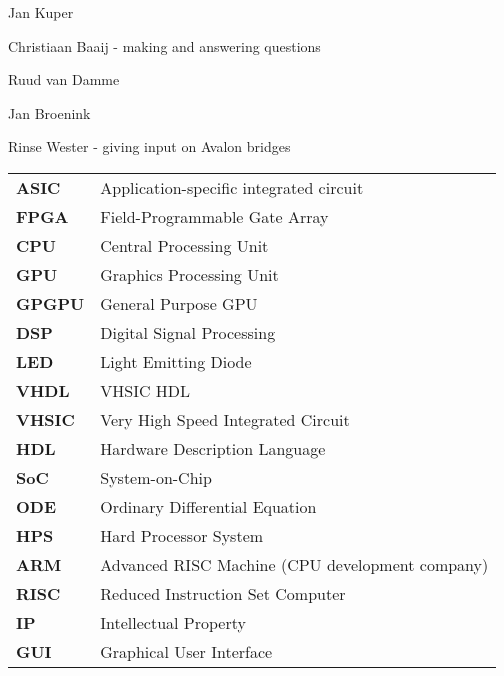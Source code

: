 
\begin{acknowledgements}      
\begin{itemizens}
	\item Jan Kuper	
	\item Christiaan Baaij - making \clash{} and answering questions
	\item Ruud van Damme
	\item Jan Broenink
	\item Rinse Wester - giving input on Avalon bridges
\end{itemizens}

\end{acknowledgements}


\vfill

\begin{acronyms}
\begin{tabular}{>{\bfseries}l l}
	ASIC & Application-specific integrated circuit \\
	FPGA & Field-Programmable Gate Array \\
	CPU & Central Processing Unit \\
	GPU & Graphics Processing Unit \\
	GPGPU & General Purpose GPU \\
	DSP & Digital Signal Processing \\
	LED & Light Emitting Diode \\
	VHDL & VHSIC HDL \\
	VHSIC & Very High Speed Integrated Circuit \\
	HDL & Hardware Description Language \\
	SoC & System-on-Chip \\ 
	ODE & Ordinary Differential Equation \\
	HPS & Hard Processor System \\
	ARM & Advanced RISC Machine (CPU development company) \\
	RISC & Reduced Instruction Set Computer \\
	IP & Intellectual Property \\
	GUI & Graphical User Interface \\
\end{tabular}		
\end{acronyms}    

  
